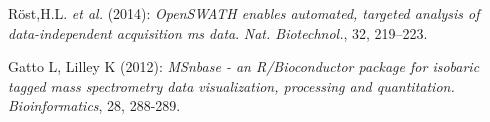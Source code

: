 \documentclass{article}
\begin{document}
\begin{multicols}{2}
\begin{minipage}[t]{.8\linewidth}
\begin{thebibliography}{1}
   Röst,H.L. \textit{et al.} (2014):
    \emph{OpenSWATH enables automated, targeted analysis of
      data-independent acquisition ms
      data}. \textit{Nat. Biotechnol.}, 32, 219–223.

   Gatto L, Lilley K (2012): \emph{MSnbase - an
    R/Bioconductor package for isobaric tagged mass spectrometry data
    visualization, processing and quantitation.}
    \textit{Bioinformatics}, 28, 288-289.
  \end{thebibliography}

\end{minipage}




\end{multicols}
\end{document}
